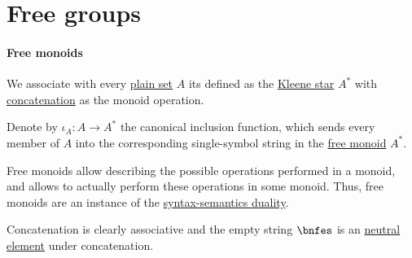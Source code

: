\section{Free groups}\label{sec:free_groups}

\paragraph{Free monoids}

\begin{definition}\label{def:free_monoid}
  We associate with every \hyperref[def:set]{plain set} \( A \) its  defined as the \hyperref[def:formal_language/kleene_star]{Kleene star} \( A^* \) with \hyperref[def:formal_language/concatenation]{concatenation} as the monoid operation.

  Denote by \( \iota_A: A \to A^* \) the canonical inclusion function, which sends every member of \( A \) into the corresponding single-symbol string in the \hyperref[def:free_monoid]{free monoid} \( A^* \).
\end{definition}
\begin{comments}
  \item Free monoids allow describing the possible operations performed in a monoid, and  allows to actually perform these operations in some monoid. Thus, free monoids are an instance of the \hyperref[con:syntax_semantics_duality]{syntax-semantics duality}.
\end{comments}
\begin{defproof}
  Concatenation is clearly associative and the empty string \( \bnfes \) is an \hyperref[def:monoid]{neutral element} under concatenation.
\end{defproof}

